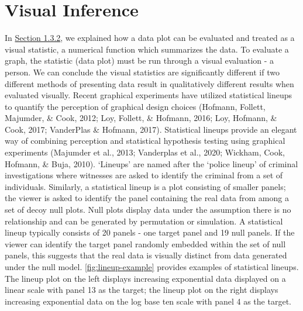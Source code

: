 \documentclass[print]{nuthesis}
\begin{document}
\hypertarget{visual-inference}{%
\section{Visual Inference}\label{visual-inference}}

In \protect\hyperlink{testing-statistical-graphics}{Section 1.3.2}, we explained how a data plot can be evaluated and treated as a visual statistic, a numerical function which summarizes the data.
To evaluate a graph, the statistic (data plot) must be run through a visual evaluation - a person.
We can conclude the visual statistics are significantly different if two different methods of presenting data result in qualitatively different results when evaluated visually.
Recent graphical experiments have utilized statistical lineups to quantify the perception of graphical design choices (Hofmann, Follett, Majumder, \& Cook, 2012; Loy, Follett, \& Hofmann, 2016; Loy, Hofmann, \& Cook, 2017; VanderPlas \& Hofmann, 2017).
Statistical lineups provide an elegant way of combining perception and statistical hypothesis testing using graphical experiments (Majumder et al., 2013; Vanderplas et al., 2020; Wickham, Cook, Hofmann, \& Buja, 2010).
`Lineups' are named after the `police lineup' of criminal investigations where witnesses are asked to identify the criminal from a set of individuals.
Similarly, a statistical lineup is a plot consisting of smaller panels; the viewer is asked to identify the panel containing the real data from among a set of decoy null plots.
Null plots display data under the assumption there is no relationship and can be generated by permutation or simulation.
A statistical lineup typically consists of 20 panels - one target panel and 19 null panels.
If the viewer can identify the target panel randomly embedded within the set of null panels, this suggests that the real data is visually distinct from data generated under the null model.
\cref{fig:lineup-example} provides examples of statistical lineups.
The lineup plot on the left displays increasing exponential data displayed on a linear scale with panel 13 as the target; the lineup plot on the right displays increasing exponential data on the log base ten scale with panel 4 as the target.
\end{document}
